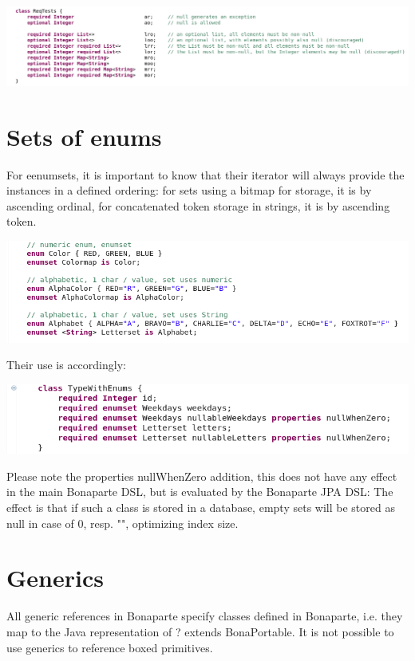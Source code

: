 \documentclass[11pt,a4paper,oneside]{article}
\begin{document}
\hspace{1cm}\includegraphics[scale=0.5]{images/tut1-016-collections.png}


\section{Sets of enums}
For eenumsets, it is important to know that their iterator will always provide the instances in a defined ordering: for
sets using a bitmap for storage, it is by ascending ordinal, for concatenated token storage in strings, it is by ascending
token.

\vspace{2mm}

\hspace{1cm}\includegraphics[scale=0.5]{images/tut1-enumsets1.png}

Their use is accordingly:

\vspace{2mm}

\hspace{1cm}\includegraphics[scale=0.5]{images/tut1-enumsets2.png}

Please note the {\ttfamily properties nullWhenZero} addition, this does not have any effect in the main Bonaparte DSL, but is
evaluated by the Bonaparte JPA DSL: The effect is that if such a class is stored in a database, empty sets will be stored as
{\ttfamily null} in case of 0, resp. {\ttfamily ""}, optimizing index size.


\section{Generics}
All generic references in Bonaparte specify classes defined in Bonaparte, i.e. they map to the Java representation of {\ttfamily
? extends BonaPortable}. It is not possible to use generics to reference boxed primitives. 
\end{document}
